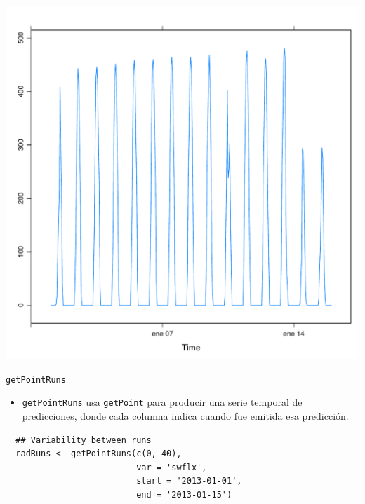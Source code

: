 \documentclass[xcolor={usenames,svgnames,dvipsnames}]{beamer}
\begin{document}
\begin{frame}[label=sec-4-4]{}
\includegraphics[width=.9\linewidth]{figs/radDays.pdf}
\end{frame}

\begin{frame}[fragile,label=sec-4-5]{\texttt{getPointRuns}}
 \begin{itemize}
\item \texttt{getPointRuns} usa \texttt{getPoint} para producir una serie temporal de
predicciones, donde cada columna indica cuando fue emitida esa
predicción.
\end{itemize}
\lstset{language=R,label= ,caption= ,numbers=none}
\begin{lstlisting}
  ## Variability between runs
  radRuns <- getPointRuns(c(0, 40),
                          var = 'swflx',
                          start = '2013-01-01',
                          end = '2013-01-15')
\end{lstlisting}
\end{frame}
\end{document}
